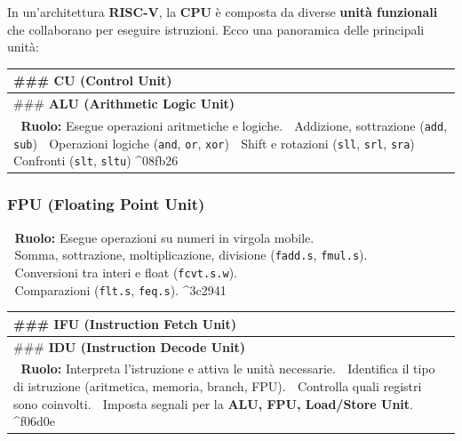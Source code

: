\documentclass[
]{article}
\author{}
\date{}
\begin{document}
In un'architettura \textbf{RISC-V}, la \textbf{CPU} è composta da
diverse \textbf{unità funzionali} che collaborano per eseguire
istruzioni. Ecco una panoramica delle principali unità:

\begin{longtable}[]{@{}
  >{\raggedright\arraybackslash}p{}@{}}
\toprule\noalign{}
\begin{minipage}[b]{\linewidth}\raggedright
\#\#\# \textbf{CU (Control Unit)}
\end{minipage} \\
\midrule\noalign{}
\endhead
\bottomrule\noalign{}
\endlastfoot
\#\#\# \textbf{ALU (Arithmetic Logic Unit)} \\
📌 \textbf{Ruolo:} Esegue operazioni aritmetiche e logiche. 🔹
Addizione, sottrazione (\texttt{add}, \texttt{sub}) 🔹 Operazioni
logiche (\texttt{and}, \texttt{or}, \texttt{xor}) 🔹 Shift e rotazioni
(\texttt{sll}, \texttt{srl}, \texttt{sra}) 🔹 Confronti (\texttt{slt},
\texttt{sltu}) \^{}08fb26 \\
\end{longtable}

\subsubsection{\texorpdfstring{\textbf{FPU (Floating Point
Unit)}}{FPU (Floating Point Unit)}}\label{fpu-floating-point-unit}

📌 \textbf{Ruolo:} Esegue operazioni su numeri in virgola mobile.\\
🔹 Somma, sottrazione, moltiplicazione, divisione (\texttt{fadd.s},
\texttt{fmul.s}).\\
🔹 Conversioni tra interi e float (\texttt{fcvt.s.w}).\\
🔹 Comparazioni (\texttt{flt.s}, \texttt{feq.s}). \^{}3c2941

\begin{longtable}[]{@{}
  >{\raggedright\arraybackslash}p{}@{}}
\toprule\noalign{}
\begin{minipage}[b]{\linewidth}\raggedright
\#\#\# \textbf{IFU (Instruction Fetch Unit)}
\end{minipage} \\
\midrule\noalign{}
\endhead
\bottomrule\noalign{}
\endlastfoot
\#\#\# \textbf{IDU (Instruction Decode Unit)} \\
📌 \textbf{Ruolo:} Interpreta l'istruzione e attiva le unità necessarie.
🔹 Identifica il tipo di istruzione (aritmetica, memoria, branch, FPU).
🔹 Controlla quali registri sono coinvolti. 🔹 Imposta segnali per la
\textbf{ALU, FPU, Load/Store Unit}. \^{}f06d0e \\
\end{longtable}
\end{document}
